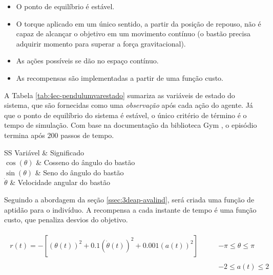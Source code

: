 \begin{itemize}[label=\raisebox{0.25ex}{\tiny$\bullet$}]
	\item O ponto de equilíbrio é estável.
	\item O torque aplicado em um único sentido, a partir da posição de repouso, não é capaz de alcançar o objetivo em um movimento contínuo (o bastão precisa adquirir momento para superar a força gravitacional).
	\item As ações possíveis se dão no espaço contínuo.
	\item As recompensas são implementadas a partir de uma função custo.
\end{itemize}

A Tabela \ref{tab:4ec-pendulumvarestado} sumariza as variáveis de estado do sistema, que são fornecidas como uma \textit{observação} após cada ação do agente. Já que o ponto de equilíbrio do sistema é estável, o único critério de término é o tempo de simulação. Com base na documentação da biblioteca Gym \cite{openaigym}, o episódio termina após 200 passos de tempo. 

\begin{table}[!htb]
	\centering
	\caption{Variáveis de estado para o pêndulo swing-up.}
	\label{tab:4ec-pendulumvarestado}
	\begin{tabular}{SS} \toprule
		{Variável} & {Significado}\\ \midrule
		{$\cos(\theta)$} & {Cosseno do ângulo do bastão} \\
		{$\sin(\theta)$} & {Seno do ângulo do bastão} \\
		{$\dot{\theta}$} & {Velocidade angular do bastão} \\ 
		\bottomrule
	\end{tabular}
\end{table}

Seguindo a abordagem da seção \ref{ssec:3deap-avalind}, será criada uma função de aptidão para o indivíduo. A recompensa a cada instante de tempo é uma função custo, que penaliza desvios do objetivo.

\begin{align}\label{eq:4ec-pendulumrewardfunction}
	\begin{split}
		r(t) = - \left[(\theta(t))^2 + 0.1(\dot\theta(t))^2+0.001(a(t))^2\right]\qquad &-\pi \le \theta \le \pi\\\\
															 	  &-2 \le a(t) \le 2
	\end{split}
\end{align}

